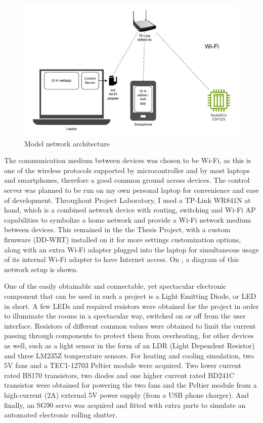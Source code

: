 \begin{figure}[!ht]
    \centering
    \includegraphics[page=1,keepaspectratio,width=150mm]{figures/box_network.drawio.pdf}
    \caption{Model network architecture}
    \label{fig:BoxNetwork}
\end{figure}

The communication medium between devices was chosen to be Wi-Fi, as this is one of the wireless protocols supported by microcontroller and by most laptops and smartphones, therefore a good common ground across devices. The control server was planned to be run on my own personal laptop for convenience and ease of development. Throughout Project Laboratory, I used a TP-Link WR841N at hand, which is a combined network device with routing, switching and Wi-Fi AP capabilities to symbolize a home network and provide a Wi-Fi network medium between devices. This remained in the the Thesis Project, with a custom firmware (DD-WRT) installed on it for more settings customization options, along with an extra Wi-Fi adapter plugged into the laptop for simultaneous usage of its internal Wi-Fi adapter to have Internet access. On , a diagram of this network setup is shown.

One of the easily obtainable and connectable, yet spectacular electronic component that can be used in such a project is a Light Emitting Diode, or LED in short. A few LEDs and required resistors were obtained for the project in order to illuminate the rooms in a spectacular way, switched on or off from the user interface. Resistors of different common values were obtained to limit the current passing through components to protect them from overheating, for other devices as well, such as a light sensor in the form of an LDR (Light Dependent Resistor) and three LM235Z temperature sensors. For heating and cooling simulation, two 5V fans and a TEC1-12703 Peltier module were acquired. Two lower current rated BS170 transistors, two diodes and one higher current rated BD241C transistor were obtained for powering the two fans and the Peltier module from a high-current (2A) external 5V power supply (from a USB phone charger). And finally, an SG90 servo was acquired and fitted with extra parts to simulate an automated electronic rolling shutter.

